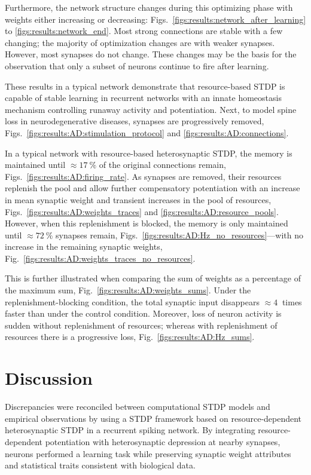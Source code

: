 \documentclass[utf8]{FrontiersinHarvard} %
\begin{document}
Furthermore, the network structure changes during this optimizing phase with weights either increasing or decreasing: Figs.~\ref{figs:results:network_after_learning} to \ref{figs:results:network_end}. Most strong connections are stable with a few changing; the majority of optimization changes are with weaker synapses. However, most synapses do not change. These changes may be the basis for the observation that only a subset of neurons continue to fire after learning.

These results in a typical network demonstrate that resource-based STDP is capable of stable learning in recurrent networks with an innate homeostasis mechanism controlling runaway activity and potentiation. Next, to model spine loss in neurodegenerative diseases, synapses are progressively removed, Figs.~\ref{figs:results:AD:stimulation_protocol} and \ref{figs:results:AD:connections}.

In a typical network with resource-based heterosynaptic STDP, the memory is maintained until $\approx\SI{17}{\percent}$ of the original connections remain, Figs.~\ref{figs:results:AD:firing_rate}. As synapses are removed, their resources replenish the pool and allow further compensatory potentiation with an increase in mean synaptic weight and transient increases in the pool of resources, Figs.~\ref{figs:results:AD:weights_traces} and \ref{figs:results:AD:resource_pools}. However, when this replenishment is blocked, the memory is only maintained until $\approx\SI{72}{\percent}$ synapses remain, Figs.~\ref{figs:results:AD:Hz_no_resources}---with no increase in the remaining synaptic weights, Fig.~\ref{figs:results:AD:weights_traces_no_resources}.

This is further illustrated when comparing the sum of weights as a percentage of the maximum sum, Fig.~\ref{figs:results:AD:weights_sums}. Under the replenishment-blocking condition, the total synaptic input disappears $\approx\SI{4}{}$ times faster than under the control condition. Moreover, loss of neuron activity is sudden without replenishment of resources; whereas with replenishment of resources there is a progressive loss, Fig.~\ref{figs:results:AD:Hz_sums}.

\section{Discussion}
Discrepancies were reconciled between computational STDP models and empirical observations by using a STDP framework based on resource-dependent heterosynaptic STDP in a recurrent spiking network. By integrating resource-dependent potentiation with heterosynaptic depression at nearby synapses, neurons performed a learning task while preserving synaptic weight attributes and statistical traits consistent with biological data.
\end{document}
